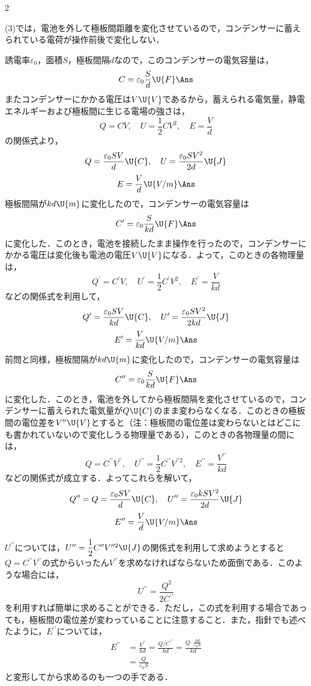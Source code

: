 \begin{multicols}{2}
\begin{sisin}
(3)では，電池を外して極板間距離を変化させているので，コンデンサーに蓄えられている電荷が操作前後で変化しない．
\end{sisin}
\KaiHead
\begin{komon}
 誘電率$\varepsilon_0$，面積$S$，極板間隔$d$なので，このコンデンサーの電気容量は，
       \[C=\varepsilon_0\frac{S}{d}\U{F}\Ans\]
       またコンデンサーにかかる電圧は$V\U{V}$であるから，蓄えられる電気量，静電エネルギーおよび極板間に生じる電場の強さは，
       \[Q=CV,\quad U=\frac{1}{2}CV^2,\quad E=\frac{V}{d}\]
       の関係式より，
       \[Q=\frac{\varepsilon_0SV}{d}\U{C},\quad U=\frac{\varepsilon_0SV^2}{2d}\U{J}\]
       \[E=\frac{V}{d}\U{V/m}\Ans\]
 極板間隔が$kd\U{m}$に変化したので，コンデンサーの電気容量は
       \[C^\prime=\varepsilon_0\frac{S}{kd}\U{F}\Ans\]
       に変化した．このとき，電池を接続したまま操作を行ったので，コンデンサーにかかる電圧は変化後も電池の電圧$V\U{V}$になる．よって，このときの各物理量は，
       \[Q^\prime=C^\prime V,\quad U^\prime=\frac{1}{2}C^\prime V^2,\quad E^\prime=\frac{V}{kd}\]
       などの関係式を利用して，
       \[Q^\prime=\frac{\varepsilon_0SV}{kd}\U{C},\quad U^\prime=\frac{\varepsilon_0SV^2}{2kd}\U{J}\]
       \[E^\prime=\frac{V}{kd}\U{V/m}\Ans\]
 前問と同様，極板間隔が$kd\U{m}$に変化したので，コンデンサーの電気容量は
       \[C^{\prime\prime}=\varepsilon_0\frac{S}{kd}\U{F}\Ans\]
       に変化した．このとき，電池を外してから極板間隔を変化させているので，コンデンサーに蓄えられた電気量が$Q\U{C}$のまま変わらなくなる．このときの極板間の電位差を$V^{\prime\prime}\U{V}$とすると（注：極板間の電位差は変わらないとはどこにも書かれていないので変化しうる物理量である），このときの各物理量の間には，
       \[Q=C^{\prime\prime}V^{\prime\prime},\quad U^{\prime\prime}=\frac{1}{2}C^{\prime\prime}V^{\prime\prime 2},\quad E^{\prime\prime}=\frac{V^{\prime\prime}}{kd}\]
       などの関係式が成立する．よってこれらを解いて，
       \[Q^{\prime\prime}=Q=\frac{\varepsilon_0SV}{d}\U{C},\quad U^{\prime\prime}=\frac{\varepsilon_0kSV^2}{2d}\U{J}\]
       \[E^{\prime\prime}=\frac{V}{d}\U{V/m}\Ans\]
\end{komon}
\begin{bekkai}
$U^{\prime\prime}$については，$U^{\prime\prime}=\dfrac{1}{2}C^{\prime\prime}V^{\prime\prime 2}\U{J}$の関係式を利用して求めようとすると$Q=C^{\prime\prime}V^{\prime\prime}$の式からいったん$V^{\prime\prime}$を求めなければならないため面倒である．このような場合には，
\[U^{\prime\prime}=\frac{Q^2}{2C^{\prime\prime}}\]
を利用すれば簡単に求めることができる．ただし，この式を利用する場合であっても，極板間の電位差が変わっていることに注意すること．また，指針でも述べたように，$E^{\prime\prime}$については，
\[\begin{aligned}
  E^{\prime\prime}&=\frac{V^{\prime\prime}}{kd}=\frac{Q/C^{\prime\prime}}{kd}=\frac{Q\cdot\frac{kd}{\varepsilon_0S}}{kd}\\
   &=\frac{Q}{\varepsilon_0S}
\end{aligned}\]
と変形してから求めるのも一つの手である．
\end{bekkai}


\end{multicols}
